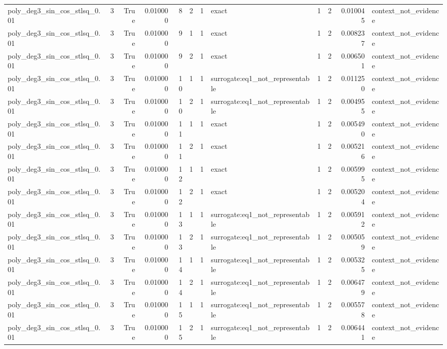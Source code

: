 \begin{tabular}{lrrrrrrlrrrl}
poly\_deg3\_sin\_cos\_stlsq\_0.01 & 3 & True & 0.010000 & 8 & 2 & 1 & exact & 1 & 2 & 0.010045 & context\_not\_evidence \\
poly\_deg3\_sin\_cos\_stlsq\_0.01 & 3 & True & 0.010000 & 9 & 1 & 1 & exact & 1 & 2 & 0.008237 & context\_not\_evidence \\
poly\_deg3\_sin\_cos\_stlsq\_0.01 & 3 & True & 0.010000 & 9 & 2 & 1 & exact & 1 & 2 & 0.006501 & context\_not\_evidence \\
poly\_deg3\_sin\_cos\_stlsq\_0.01 & 3 & True & 0.010000 & 10 & 1 & 1 & surrogate:eq1\_not\_representable & 1 & 2 & 0.011250 & context\_not\_evidence \\
poly\_deg3\_sin\_cos\_stlsq\_0.01 & 3 & True & 0.010000 & 10 & 2 & 1 & surrogate:eq1\_not\_representable & 1 & 2 & 0.004955 & context\_not\_evidence \\
poly\_deg3\_sin\_cos\_stlsq\_0.01 & 3 & True & 0.010000 & 11 & 1 & 1 & exact & 1 & 2 & 0.005490 & context\_not\_evidence \\
poly\_deg3\_sin\_cos\_stlsq\_0.01 & 3 & True & 0.010000 & 11 & 2 & 1 & exact & 1 & 2 & 0.005216 & context\_not\_evidence \\
poly\_deg3\_sin\_cos\_stlsq\_0.01 & 3 & True & 0.010000 & 12 & 1 & 1 & exact & 1 & 2 & 0.005995 & context\_not\_evidence \\
poly\_deg3\_sin\_cos\_stlsq\_0.01 & 3 & True & 0.010000 & 12 & 2 & 1 & exact & 1 & 2 & 0.005204 & context\_not\_evidence \\
poly\_deg3\_sin\_cos\_stlsq\_0.01 & 3 & True & 0.010000 & 13 & 1 & 1 & surrogate:eq1\_not\_representable & 1 & 2 & 0.005912 & context\_not\_evidence \\
poly\_deg3\_sin\_cos\_stlsq\_0.01 & 3 & True & 0.010000 & 13 & 2 & 1 & surrogate:eq1\_not\_representable & 1 & 2 & 0.005059 & context\_not\_evidence \\
poly\_deg3\_sin\_cos\_stlsq\_0.01 & 3 & True & 0.010000 & 14 & 1 & 1 & surrogate:eq1\_not\_representable & 1 & 2 & 0.005325 & context\_not\_evidence \\
poly\_deg3\_sin\_cos\_stlsq\_0.01 & 3 & True & 0.010000 & 14 & 2 & 1 & surrogate:eq1\_not\_representable & 1 & 2 & 0.006479 & context\_not\_evidence \\
poly\_deg3\_sin\_cos\_stlsq\_0.01 & 3 & True & 0.010000 & 15 & 1 & 1 & surrogate:eq1\_not\_representable & 1 & 2 & 0.005578 & context\_not\_evidence \\
poly\_deg3\_sin\_cos\_stlsq\_0.01 & 3 & True & 0.010000 & 15 & 2 & 1 & surrogate:eq1\_not\_representable & 1 & 2 & 0.006441 & context\_not\_evidence \\

\end{tabular}
